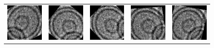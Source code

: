\documentclass{beamer}
\begin{document}
\begin{frame}[label=data_augmentation]
\begin{figure}
\begin{tabular}{ccccc}
\includegraphics[scale=0.5]{augmented/_0_7140.jpeg} & \includegraphics[scale=0.5]{augmented/_0_7746.jpeg} & \includegraphics[scale=0.5]{augmented/_0_8553.jpeg} & \includegraphics[scale=0.5]{augmented/_0_8763.jpeg} & \includegraphics[scale=0.5]{augmented/_0_9361.jpeg} 
	
\end{tabular}
\end{figure}
\end{frame}

%
%
\end{document}
